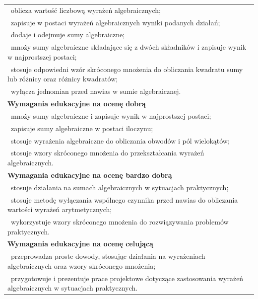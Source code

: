 \documentclass[12pt,a4paper]{article}
\begin{document}
\begin{longtable}{|p{16cm}|}
		\textbullet\ oblicza wartość liczbową wyrażeń algebraicznych; \\
		
		\textbullet\ zapisuje w postaci wyrażeń algebraicznych wyniki podanych działań; \\
		
		\textbullet\ dodaje i odejmuje sumy algebraiczne; \\
		
		\textbullet\ mnoży sumy algebraiczne składające się z dwóch składników i zapisuje wynik w najprostszej postaci; \\
		
		\textbullet\ stosuje odpowiedni wzór skróconego mnożenia do obliczania kwadratu sumy lub różnicy oraz różnicy kwadratów; \\
		
		\textbullet\ wyłącza jednomian przed nawias w sumie algebraicznej. \\ \hline
		
		\textbf{Wymagania edukacyjne na ocenę dobrą} \\ \hline
		
		\textbullet\ mnoży sumy algebraiczne i zapisuje wynik w najprostszej postaci; \\
		
		\textbullet\ zapisuje sumy algebraiczne w postaci iloczynu; \\
		
		\textbullet\ stosuje wyrażenia algebraiczne do obliczania obwodów i pól wielokątów; \\
		
		\textbullet\ stosuje wzory skróconego mnożenia do przekształcania wyrażeń algebraicznych. \\ \hline
		
		\textbf{Wymagania edukacyjne na ocenę bardzo dobrą} \\ \hline
		
		\textbullet\ stosuje działania na sumach algebraicznych w sytuacjach praktycznych; \\
		
		\textbullet\ stosuje metodę wyłączania wspólnego czynnika przed nawias do obliczania wartości wyrażeń arytmetycznych; \\
		
		\textbullet\ wykorzystuje wzory skróconego mnożenia do rozwiązywania problemów praktycznych. \\ \hline
		
		\textbf{Wymagania edukacyjne na ocenę celującą} \\ \hline
		
		\textbullet\ przeprowadza proste dowody, stosując działania na wyrażeniach algebraicznych oraz wzory skróconego mnożenia; \\
		
		\textbullet\ przygotowuje i prezentuje prace projektowe dotyczące zastosowania wyrażeń algebraicznych w sytuacjach praktycznych. \\ \hline
		
	\end{longtable}
	
\end{document}
